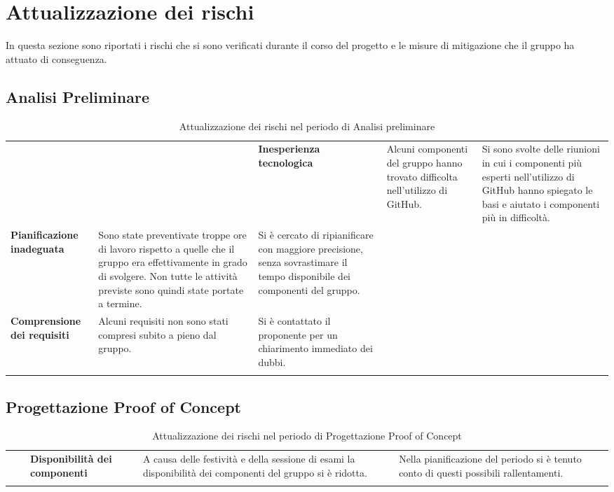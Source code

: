 \section{Attualizzazione dei rischi}
In questa sezione sono riportati i rischi che si sono verificati durante il corso del progetto e 
le misure di mitigazione che il gruppo ha attuato di conseguenza.
\subsection{Analisi Preliminare}
\begin{longtable}{ 
	>{\centering}M{0.20\textwidth} 
	>{\raggedright}M{0.30\textwidth}
	>{\raggedright}M{0.40\textwidth}
	}
	\rowcolorhead
	\centering 
	 &	
	 &
	\endfirsthead	
	\endhead
	
	\textbf{Inesperienza tecnologica} & 
    Alcuni componenti del gruppo hanno trovato difficolta nell'utilizzo di GitHub. & 
    Si sono svolte delle riunioni in cui i componenti più esperti nell'utilizzo di GitHub 
    hanno spiegato le basi e aiutato i componenti più in difficoltà.  \tabularnewline
    \textbf{Pianificazione inadeguata} & Sono state preventivate troppe ore di 
    lavoro rispetto a quelle che il gruppo era effettivamente in grado di svolgere. Non tutte le 
    attività previste sono quindi state portate a termine.  & 
    Si è cercato di ripianificare con maggiore precisione, senza sovrastimare il tempo disponibile dei 
    componenti del gruppo. \tabularnewline
    \textbf{Comprensione dei requisiti} & Alcuni requisiti non sono stati compresi subito a pieno dal gruppo.  & 
    Si è contattato il proponente per un chiarimento immediato dei dubbi. \tabularnewline
	\captionline \caption{Attualizzazione dei rischi nel periodo di Analisi preliminare}
\end{longtable}

\subsection{Progettazione Proof of Concept}
\begin{longtable}{ 
	>{\centering}M{0.20\textwidth} 
	>{\raggedright}M{0.30\textwidth}
	>{\raggedright}M{0.40\textwidth}
	}
	\rowcolorhead
	\centering 
	 &	
	 &
	\endfirsthead	
	\endhead
	
	\textbf{Disponibilità dei componenti} & 
    A causa delle festività e della sessione di esami la disponibilità dei componenti del gruppo 
    si è ridotta. & 
    Nella pianificazione del periodo si è tenuto conto di questi possibili rallentamenti.  \tabularnewline
	\captionline \caption{Attualizzazione dei rischi nel periodo di Progettazione Proof of Concept}
\end{longtable}

